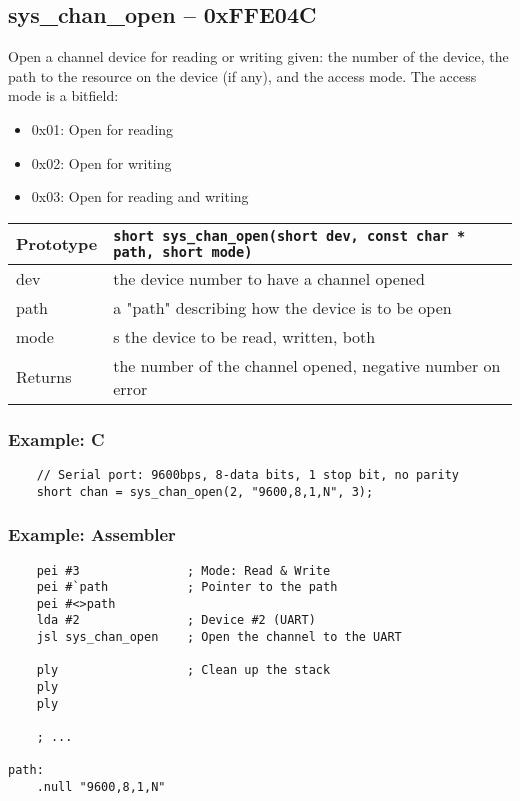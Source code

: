 \subsection*{sys\_chan\_open -- 0xFFE04C}
Open a channel device for reading or writing given: the number of the device, the path to the resource on the device (if any), and the access mode. The access mode is a bitfield:
\begin{itemize}
    \item 0x01: Open for reading
    \item 0x02: Open for writing
    \item 0x03: Open for reading and writing
\end{itemize}

\bigskip

\begin{tabular}{|l||l|} \hline
Prototype & \lstinline!short sys_chan_open(short dev, const char * path, short mode)! \\ \hline
dev & the device number to have a channel opened \\ \hline
path & a "path" describing how the device is to be open \\ \hline
mode & s the device to be read, written, both\\ \hline
Returns & the number of the channel opened, negative number on error \\ \hline
\end{tabular}

\subsubsection*{Example: C}
\begin{lstlisting}
    // Serial port: 9600bps, 8-data bits, 1 stop bit, no parity
    short chan = sys_chan_open(2, "9600,8,1,N", 3);    
\end{lstlisting}

\subsubsection*{Example: Assembler}
\begin{verbatim}
    pei #3               ; Mode: Read & Write
    pei #`path           ; Pointer to the path
    pei #<>path
    lda #2               ; Device #2 (UART)
    jsl sys_chan_open    ; Open the channel to the UART

    ply                  ; Clean up the stack
    ply
    ply

    ; ...

path:
    .null "9600,8,1,N"
\end{verbatim}


